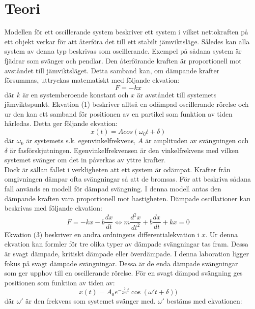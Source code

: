 \documentclass[a4paper,10pt]{article}
\begin{document}
\section{Teori}
Modellen för ett oscillerande system beskriver ett system i vilket nettokraften på ett objekt verkar för att återföra det till ett stabilt jämviktsläge. Således kan alla system av denna typ beskrivas som oscillerande. Exempel på sådana system är fjädrar som svänger och pendlar. Den återförande kraften är proportionell mot avståndet till jämviktsläget. Detta samband kan, om dämpande krafter försummas, uttryckas matematiskt med följande ekvation:
\begin{equation}
	F = -kx
\end{equation}
där $k$ är en systemberoende konstant och $x$ är avståndet till systemets jämviktspunkt. Ekvation (1) beskriver alltså en odämpad oscillerande rörelse och ur den kan ett samband för positionen av en partikel som funktion av tiden härledas. Detta ger följande ekvation:
\begin{equation}
	x(t) = A cos(\omega_0t + \delta)
\end{equation}
där $\omega_0$ är systemets s.k. egenvinkelfrekvens, $A$ är amplituden av svängningen och $\delta$ är fasförskjutningen. Egenvinkelfrekvensen är den vinkelfrekvens med vilken systemet svänger om det in påverkas av yttre krafter. \\
\indent Dock är sällan fallet i verkligheten att ett system är odämpat. Krafter från omgivningen dämpar ofta svängningar så att de bromsas. För att beskriva sådana fall används en modell för dämpad svängning. I denna modell antas den dämpande kraften vara proportionell mot hastigheten. Dämpade oscillationer kan beskrivas med följande ekvation:
\begin{equation}
	F = -kx - b\frac{dx}{dt} \Longleftrightarrow m\frac{d^2x}{dt^2} + b\frac{dx}{dt} + kx = 0
\end{equation}
Ekvation (3) beskriver en andra ordningens differentialekvation i $x$. Ur denna ekvation kan formler för tre olika typer av dämpade svängningar tas fram. Dessa är svagt dämpade, kritiskt dämpade eller överdämpade. I denna laboration ligger fokus på svagt dämpade svängningar. Dessa är de enda dämpade svängningar som ger upphov till en oscillerande rörelse. För en svagt dämpad svängning ges positionen som funktion av tiden av:
\begin{equation}
	x(t) = A_0e^{-\frac{b}{2m}t}\cos(\omega't + \delta))
\end{equation}
där $\omega'$ är den frekvens som systemet svänger med. $\omega'$ bestäms med ekvationen:
\end{document}
